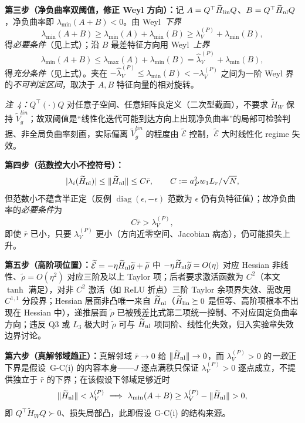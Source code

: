 \documentclass[fontset=windows,11pt]{ctexart}
\DeclarePairedDelimiter{\norm}{\lVert}{\rVert}
\newcommand{\W}{W}
\newcommand{\Erem}{\mathcal E}
\newcommand{\wt}[1]{\widetilde{#1}}
\DeclareMathOperator{\diag}{diag}
\numberwithin{equation}{section}
\begin{document}
\noindent\textbf{第三步（净负曲率双阈值，修正 Weyl 方向）：}记 $A=Q^\top\wt H_{\rm lin}Q$、$B=Q^\top\wt H_{\rm nl}Q$，净负曲率即 $\lambda_{\min}(A+B)<0$。由 Weyl~\emph{下界}
\begin{equation}
\lambda_{\min}(A+B)\ge\lambda_{\min}(A)+\lambda_{\min}(B)
\ge\lambda_V^{(P)}+\lambda_{\min}(B),
\end{equation}
得\emph{必要条件}（见上式）；沿 $B$ 最差特征方向用 Weyl~\emph{上界}
\begin{equation}
\lambda_{\min}(A+B)\le\lambda_{\max}(A)+\lambda_{\min}(B)
=\widehat\lambda_V^{(P)}+\lambda_{\min}(B),
\end{equation}
得\emph{充分条件}（见上式）。夹在 $-\widehat\lambda_V^{(P)}\le\lambda_{\min}(B)<-\lambda_V^{(P)}$ 之间为一阶 Weyl 界的\emph{不可判定区间}，取决于 $A,B$ 特征向量的相对旋转。

\noindent\emph{注~4：}$Q^\top(\cdot)Q$ 对任意子空间、任意矩阵良定义（二次型截面），不要求 $\wt H_{\W}$ 保持 $\wt V_g^{lin}$；故双阈值是“线性化迭代可能到达方向上出现净负曲率”的局部可检验判据、非全局负曲率刻画，实际偏离 $\wt V_g^{lin}$ 的程度由 $\wt\Erem$ 控制，$\wt\Erem$ 大时线性化 regime 失效。

\noindent\textbf{第四步（范数控大小不控符号）：}
\begin{equation}
|\lambda_i(\wt H_{\rm nl})|\le\norm{\wt H_{\rm nl}}\le C\bar r,
\qquad C:=a_P^2w_1L_r/\sqrt N,
\end{equation}
但范数小不蕴含半正定（反例 $\diag(\epsilon,-\epsilon)$ 范数为 $\epsilon$ 仍有负特征值）；故净负曲率的\emph{必要条件}为
\begin{equation}
C\bar r>\lambda_V^{(P)},
\end{equation}
即使 $\bar r$ 已小，只要 $\lambda_V^{(P)}$ 更小（方向近零空间、Jacobian 病态），仍可能损失上升。

\noindent\textbf{第五步（高阶项位置）：}$\wt\Erem=-\eta\wt H_{\rm nl}\wt g+\wt\rho$ 中 $-\eta\wt H_{\rm nl}\wt g=O(\eta)$ 对应 Hessian 非线性、$\wt\rho=O(\eta^2)$ 对应三阶及以上 Taylor 项；后者要求激活函数为 $C^2$（本文 $\tanh$ 满足），对非 $C^2$ 激活（如 ReLU 折点）三阶 Taylor 余项界失效、需改用 $C^{1,1}$ 分段界；Hessian 层面非凸唯一来自 $\wt H_{\rm nl}$（$\wt H_{\rm lin}\succeq0$ 是恒等、高阶项根本不出现在 Hessian 中），递推层面 $\wt\rho$ 已被残差比式第二项统一控制、不对应固定负曲率方向；违反 Q3 或 $L_3$ 极大时 $\wt\rho$ 可与 $\wt H_{\rm nl}$ 项同阶、线性化失效，归入实验章失效边界讨论。

\noindent\textbf{第六步（真解邻域趋正）：}真解邻域 $\bar r\to0$ 给 $\norm{\wt H_{\rm nl}}\to0$，而 $\lambda_V^{(P)}>0$ 的\emph{一致}正下界是假设~G-C(i) 的内容本身——$J$ 逐点满秩只保证 $\lambda_V^{(P)}>0$ 逐点成立，不提供独立于 $\bar r$ 的下界；在该假设下邻域足够近时
\begin{equation}
\norm{\wt H_{\rm nl}}<\lambda_V^{(P)}
\ \Longrightarrow\
\lambda_{\min}(A+B)\ge\lambda_V^{(P)}-\norm{\wt H_{\rm nl}}>0,
\end{equation}
即 $Q^\top\wt H_{\W}Q\succ0$、损失局部凸，此即假设 G-C(i) 的结构来源。
\end{document}

